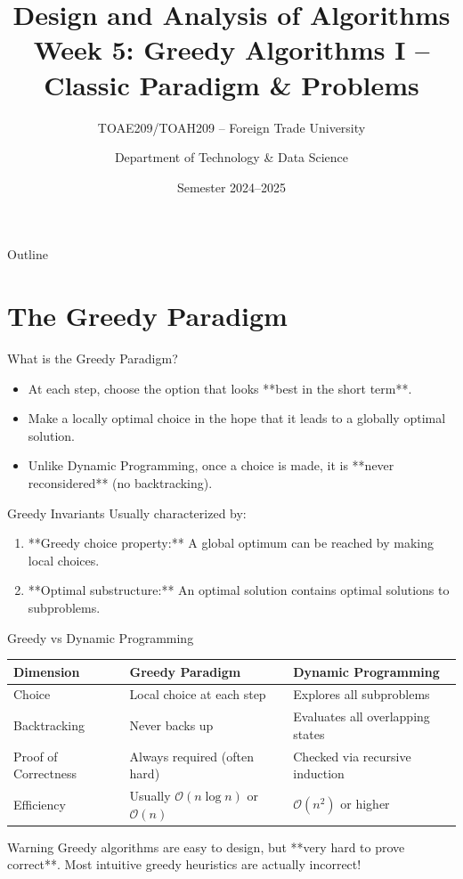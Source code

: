 \documentclass[aspectratio=169,xcolor=dvipsnames]{beamer}
\title[Algorithms -- Week 5]{\textbf{Design and Analysis of Algorithms}\\
\large Week 5: Greedy Algorithms I -- Classic Paradigm \& Problems}
\subtitle{TOAE209/TOAH209 -- Foreign Trade University}
\author{Department of Technology \& Data Science}
\date{Semester 2024--2025}
\begin{document}
\begin{frame}
  \titlepage
\end{frame}

\begin{frame}{Outline}
  \tableofcontents
\end{frame}

\section{The Greedy Paradigm}

\begin{frame}{What is the Greedy Paradigm?}
  \begin{itemize}
    \item At each step, choose the option that looks **best in the short term**.
    \item Make a locally optimal choice in the hope that it leads to a globally optimal solution.
    \item Unlike Dynamic Programming, once a choice is made, it is **never reconsidered** (no backtracking).
  \end{itemize}
  \begin{block}{Greedy Invariants}
    Usually characterized by:
    \begin{enumerate}
      \item **Greedy choice property:** A global optimum can be reached by making local choices.
      \item **Optimal substructure:** An optimal solution contains optimal solutions to subproblems.
    \end{enumerate}
  \end{block}
\end{frame}

\begin{frame}{Greedy vs Dynamic Programming}
  \begin{center}
  \begin{tabular}{lll}
    \toprule
    \textbf{Dimension} & \textbf{Greedy Paradigm} & \textbf{Dynamic Programming} \\
    \midrule
    Choice & Local choice at each step & Explores all subproblems \\
    Backtracking & Never backs up & Evaluates all overlapping states \\
    Proof of Correctness & Always required (often hard) & Checked via recursive induction \\
    Efficiency & Usually $\mathcal{O}(n \log n)$ or $\mathcal{O}(n)$ & $\mathcal{O}(n^2)$ or higher \\
    \bottomrule
  \end{tabular}
  \end{center}
  \begin{alertblock}{Warning}
    Greedy algorithms are easy to design, but **very hard to prove correct**. Most intuitive greedy heuristics are actually incorrect!
  \end{alertblock}
\end{frame}
\end{document}
